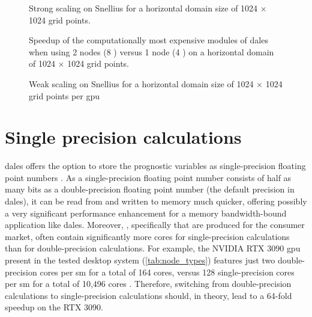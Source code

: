\begin{figure}[h!]
    \centering
    
    \caption{Strong scaling on Snellius for a horizontal domain size of 1024 $\times$ 1024 grid points.}
    \label{fig:strong_scaling}
\end{figure}

\begin{figure}[h!]
    \centering
    
    \caption{Speedup of the computationally most expensive modules of \acrshort{dales} when using 2 nodes (8 ) versus 1 node (4 )  on a horizontal domain of 1024 $\times$ 1024 grid points.}
    \label{fig:speedup_per_module}
\end{figure}

\begin{figure}[h!]
    \centering
    
    \caption{Weak scaling on Snellius for a horizontal domain size of 1024 $\times$ 1024 grid points per \acrshort{gpu}}
    \label{fig:weak_scaling}
\end{figure}


\newpage

\section{Single precision calculations}
\acrshort{dales} offers the option to store the prognostic variables as single-precision floating point numbers \citep{janssonCloudBotanyShallow2023}. As a single-precision floating point number consists of half as many bits as a double-precision floating point number (the default precision in \acrshort{dales}), it can be read from and written to memory much quicker, offering possibly a very significant performance enhancement for a memory bandwidth-bound application like \acrshort{dales}. Moreover, , specifically  that are produced for the consumer market, often contain significantly more cores for single-precision calculations than for double-precision calculations. For example, the NVIDIA RTX 3090 \acrshort{gpu} present in the tested desktop system (\autoref{tab:node_types}) features just two double-precision cores per \acrshort{sm} for a total of 164 cores, versus 128 single-precision cores per \acrshort{sm} for a total of 10,496 cores \citep{nvidiaNVIDIAAmpereGA1022021}. Therefore, switching from double-precision calculations to single-precision calculations should, in theory, lead to a 64-fold speedup on the RTX 3090. 


